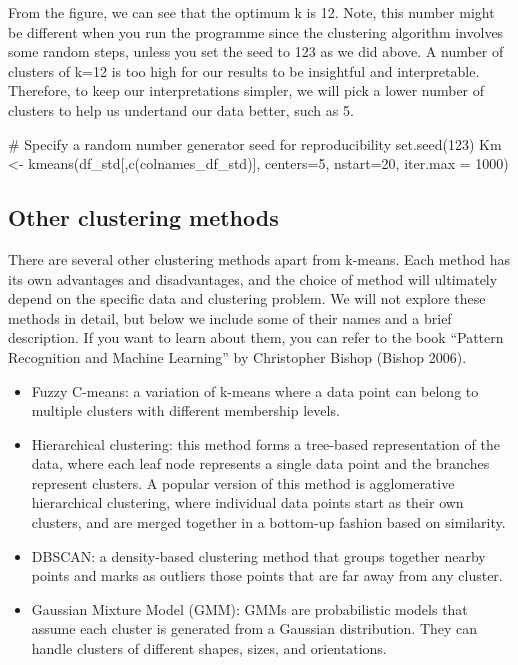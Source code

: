 \documentclass[
  letterpaper,
  DIV=11,
  numbers=noendperiod]{scrreprt}
\newenvironment{Shaded}{\begin{snugshade}}{\end{snugshade}}
\newcommand{\AttributeTok}[1]{\textcolor[rgb]{0.40,0.45,0.13}{#1}}
\newcommand{\CommentTok}[1]{\textcolor[rgb]{0.37,0.37,0.37}{#1}}
\newcommand{\DecValTok}[1]{\textcolor[rgb]{0.68,0.00,0.00}{#1}}
\newcommand{\FunctionTok}[1]{\textcolor[rgb]{0.28,0.35,0.67}{#1}}
\newcommand{\NormalTok}[1]{\textcolor[rgb]{0.00,0.23,0.31}{#1}}
\newcommand{\OtherTok}[1]{\textcolor[rgb]{0.00,0.23,0.31}{#1}}
\begin{document}
From the figure, we can see that the optimum k is 12. Note, this number
might be different when you run the programme since the clustering
algorithm involves some random steps, unless you set the seed to 123 as
we did above. A number of clusters of k=12 is too high for our results
to be insightful and interpretable. Therefore, to keep our
interpretations simpler, we will pick a lower number of clusters to help
us undertand our data better, such as 5.

\begin{Shaded}
\begin{Highlighting}[]
\CommentTok{\# Specify a random number generator seed for reproducibility}
\FunctionTok{set.seed}\NormalTok{(}\DecValTok{123}\NormalTok{) }
\NormalTok{Km }\OtherTok{\textless{}{-}} \FunctionTok{kmeans}\NormalTok{(df\_std[,}\FunctionTok{c}\NormalTok{(colnames\_df\_std)], }\AttributeTok{centers=}\DecValTok{5}\NormalTok{, }\AttributeTok{nstart=}\DecValTok{20}\NormalTok{, }\AttributeTok{iter.max =} \DecValTok{1000}\NormalTok{)}
\end{Highlighting}
\end{Shaded}

\hypertarget{other-clustering-methods}{%
\subsection{Other clustering methods}\label{other-clustering-methods}}

There are several other clustering methods apart from k-means. Each
method has its own advantages and disadvantages, and the choice of
method will ultimately depend on the specific data and clustering
problem. We will not explore these methods in detail, but below we
include some of their names and a brief description. If you want to
learn about them, you can refer to the book ``Pattern Recognition and
Machine Learning'' by Christopher Bishop (Bishop 2006).

\begin{itemize}
\item
  Fuzzy C-means: a variation of k-means where a data point can belong to
  multiple clusters with different membership levels.
\item
  Hierarchical clustering: this method forms a tree-based representation
  of the data, where each leaf node represents a single data point and
  the branches represent clusters. A popular version of this method is
  agglomerative hierarchical clustering, where individual data points
  start as their own clusters, and are merged together in a bottom-up
  fashion based on similarity.
\item
  DBSCAN: a density-based clustering method that groups together nearby
  points and marks as outliers those points that are far away from any
  cluster.
\item
  Gaussian Mixture Model (GMM): GMMs are probabilistic models that
  assume each cluster is generated from a Gaussian distribution. They
  can handle clusters of different shapes, sizes, and orientations.\\
\end{itemize}
\end{document}
